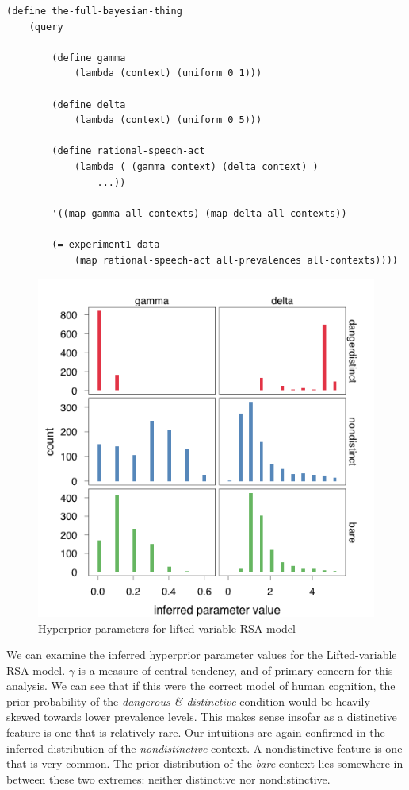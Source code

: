 \documentclass[10pt,letterpaper]{article}
\begin{document}
\begin{lstlisting}
(define the-full-bayesian-thing
	(query
	
		(define gamma
			(lambda (context) (uniform 0 1)))
			
		(define delta
			(lambda (context) (uniform 0 5)))
	
		(define rational-speech-act
			(lambda ( (gamma context) (delta context) ) 
				...))
				
		'((map gamma all-contexts) (map delta all-contexts))
		
		(= experiment1-data 
			(map rational-speech-act all-prevalences all-contexts))))
\end{lstlisting}

\begin{figure}
\centering
    \includegraphics[width=\columnwidth]{fig4_bda2_hyper}
    \caption{Hyperprior parameters for lifted-variable RSA model}
  \label{fig:bda2hyperparams}
\end{figure}

We can examine the inferred hyperprior parameter values for the Lifted-variable RSA model. $\gamma$ is a measure of central tendency, and of primary concern for this analysis. We can see that if this were the correct model of human cognition, the prior probability of the \emph{dangerous \& distinctive} condition would be heavily skewed towards lower prevalence levels. This makes sense insofar as a distinctive feature is one that is relatively rare. Our intuitions are again confirmed in the inferred distribution of the \emph{nondistinctive} context. A nondistinctive feature is one that is very common. The prior distribution of the \emph{bare} context lies somewhere in between these two extremes: neither distinctive nor nondistinctive.
\end{document}

